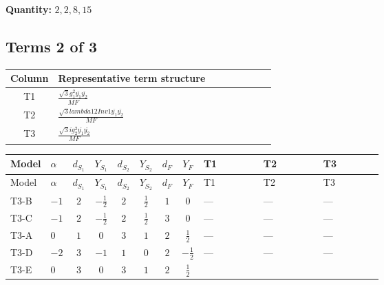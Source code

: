 \documentclass[8pt]{article}
\begin{document}
\begin{landscape}
\begin{longtable}{@{}llcccccc >{\raggedright\arraybackslash}p{0.21\linewidth} >{\raggedright\arraybackslash}p{0.21\linewidth} >{\raggedright\arraybackslash}p{0.21\linewidth}@{}}
\midrule
\bottomrule
\end{longtable}
\clearpage
\noindent\textbf{Quantity: }$\mathrm{2,2,8,15}$\par\smallskip
\subsection*{Terms 2 of 3}
\begin{center}
\begin{tabular}{@{}c >{\raggedright\arraybackslash}p{0.82\linewidth}@{}}
\toprule
Column & Representative term structure \\
\midrule
T1 & \(\displaystyle \frac{\sqrt{3} g_{1}^{2} \overline{y_{1}} \overline{y_{2}}}{MF}\) \\
\midrule
T2 & \(\displaystyle \frac{\sqrt{3} lambda12Inv1 \overline{y_{1}} \overline{y_{2}}}{MF}\) \\
\midrule
T3 & \(\displaystyle \frac{\sqrt{3} i g_{2}^{2} \overline{y_{1}} \overline{y_{2}}}{MF}\) \\
\midrule
\bottomrule
\end{tabular}
\end{center}
\smallskip
\tiny
\begin{longtable}{@{}llcccccc >{\raggedright\arraybackslash}p{0.21\linewidth} >{\raggedright\arraybackslash}p{0.21\linewidth} >{\raggedright\arraybackslash}p{0.21\linewidth}@{}}
\toprule
Model & $\alpha$ & $d_{S_1}$ & $Y_{S_1}$ & $d_{S_2}$ & $Y_{S_2}$ & $d_F$ & $Y_F$ & T1 & T2 & T3 \\
\midrule
\endfirsthead
\toprule
Model & $\alpha$ & $d_{S_1}$ & $Y_{S_1}$ & $d_{S_2}$ & $Y_{S_2}$ & $d_F$ & $Y_F$ & T1 & T2 & T3 \\
\midrule
\endhead
T3-B & $-1$ & $2$ & $-\frac{1}{2}$ & $2$ & $\frac{1}{2}$ & $1$ & $0$ & --- & --- & --- \\
\midrule
T3-C & $-1$ & $2$ & $-\frac{1}{2}$ & $2$ & $\frac{1}{2}$ & $3$ & $0$ & --- & --- & --- \\
\midrule
T3-A & $0$ & $1$ & $0$ & $3$ & $1$ & $2$ & $\frac{1}{2}$ & --- & --- & --- \\
\midrule
T3-D & $-2$ & $3$ & $-1$ & $1$ & $0$ & $2$ & $-\frac{1}{2}$ & --- & --- & --- \\
\midrule
T3-E & $0$ & $3$ & $0$ & $3$ & $1$ & $2$ & $\frac{1}{2}$ & \scriptsize\adjustbox{max width=\linewidth}{$\begin{gathered} - \frac{\sqrt{3} g_{1}^{2} \overline{y_{1}} \overline{y_{2}}}{8 MF}\end{gathered}$} & \scriptsize\adjustbox{max width=\linewidth}{$\begin{gathered} \frac{\sqrt{3} lambda12Inv1 \overline{y_{1}} \overline{y_{2}}}{6 MF}\end{gathered}$} & \scriptsize\adjustbox{max width=\linewidth}{$\begin{gathered} - \frac{\sqrt{3} i g_{2}^{2} \overline{y_{1}} \overline{y_{2}}}{6 MF}\end{gathered}$} \\

\end{longtable}
\end{landscape}
\end{document}

